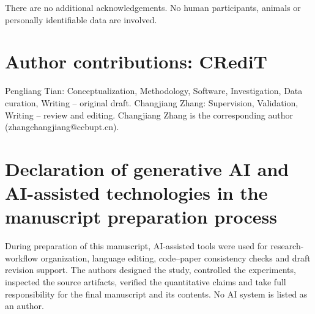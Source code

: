 \documentclass[10pt,twocolumn]{article}
\begin{document}
There are no additional acknowledgements. No human participants, animals or personally identifiable data are involved.

\section*{Author contributions: CRediT}

Pengliang Tian: Conceptualization, Methodology, Software, Investigation, Data curation, Writing -- original draft. Changjiang Zhang: Supervision, Validation, Writing -- review and editing. Changjiang Zhang is the corresponding author (zhangchangjiang@ccbupt.cn).

\section*{Declaration of generative AI and AI-assisted technologies in the manuscript preparation process}

During preparation of this manuscript, AI-assisted tools were used for research-workflow organization, language editing, code--paper consistency checks and draft revision support. The authors designed the study, controlled the experiments, inspected the source artifacts, verified the quantitative claims and take full responsibility for the final manuscript and its contents. No AI system is listed as an author.



\end{document}
